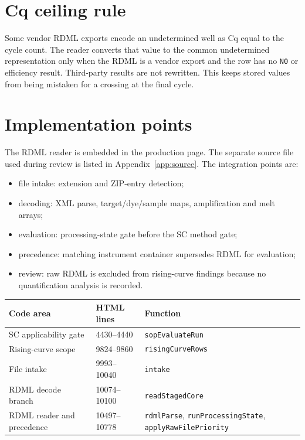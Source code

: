 \section{Cq ceiling rule}
Some vendor RDML exports encode an undetermined well as Cq equal to the cycle count. The reader converts that value to the common undetermined representation only when the RDML is a vendor export and the row has no \texttt{N0} or efficiency result. Third-party results are not rewritten. This keeps stored values from being mistaken for a crossing at the final cycle.

\section{Implementation points}
The RDML reader is embedded in the production page. The separate source file used during review is listed in Appendix~\ref{app:source}. The integration points are:

\begin{itemize}
\item file intake: extension and ZIP-entry detection;
\item decoding: XML parse, target/dye/sample maps, amplification and melt arrays;
\item evaluation: processing-state gate before the SC method gate;
\item precedence: matching instrument container supersedes RDML for evaluation;
\item review: raw RDML is excluded from rising-curve findings because no quantification analysis is recorded.
\end{itemize}

\begin{center}\small
\begin{tabular}{@{}p{4.0cm}p{2.0cm}p{7.8cm}@{}}\toprule
Code area & HTML lines & Function\\\midrule
SC applicability gate & 4430--4440 & \texttt{sopEvaluateRun}\\
Rising-curve scope & 9824--9860 & \texttt{risingCurveRows}\\
File intake & 9993--10040 & \texttt{intake}\\
RDML decode branch & 10074--10100 & \texttt{readStagedCore}\\
RDML reader and precedence & 10497--10778 & \texttt{rdmlParse}, \texttt{runProcessingState}, \texttt{applyRawFilePriority}\\\bottomrule
\end{tabular}
\end{center}

